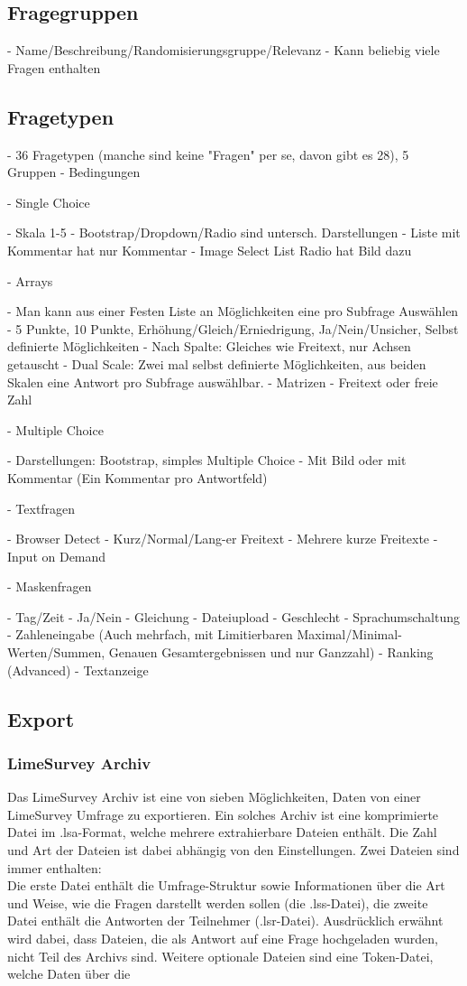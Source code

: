 \subsection{Fragegruppen}

- Name/Beschreibung/Randomisierungsgruppe/Relevanz
- Kann beliebig viele Fragen enthalten

\subsection{Fragetypen}

- 36 Fragetypen (manche sind keine "Fragen" per se, davon gibt es 28), 5 Gruppen
- Bedingungen

- Single Choice

- Skala 1-5
- Bootstrap/Dropdown/Radio sind untersch. Darstellungen
- Liste mit Kommentar hat nur Kommentar
- Image Select List Radio hat Bild dazu

- Arrays

- Man kann aus einer Festen Liste an Möglichkeiten eine pro Subfrage Auswählen
- 5 Punkte, 10 Punkte, Erhöhung/Gleich/Erniedrigung, Ja/Nein/Unsicher, Selbst definierte Möglichkeiten
- Nach Spalte: Gleiches wie Freitext, nur Achsen getauscht
- Dual Scale: Zwei mal selbst definierte Möglichkeiten, aus beiden Skalen eine Antwort pro Subfrage auswählbar.
- Matrizen
- Freitext oder freie Zahl

- Multiple Choice

- Darstellungen: Bootstrap, simples Multiple Choice
- Mit Bild oder mit Kommentar (Ein Kommentar pro Antwortfeld)

- Textfragen

- Browser Detect
- Kurz/Normal/Lang-er Freitext
- Mehrere kurze Freitexte
- Input on Demand

- Maskenfragen

- Tag/Zeit
- Ja/Nein
- Gleichung
- Dateiupload
- Geschlecht
- Sprachumschaltung
- Zahleneingabe (Auch mehrfach, mit Limitierbaren Maximal/Minimal-Werten/Summen, Genauen Gesamtergebnissen und nur Ganzzahl)
- Ranking (Advanced)
- Textanzeige

\subsection{Export}
\subsubsection{LimeSurvey Archiv}
\label{lsa}
Das LimeSurvey Archiv ist eine von sieben Möglichkeiten, Daten von einer LimeSurvey Umfrage zu exportieren.
Ein solches Archiv ist eine komprimierte Datei im .lsa-Format, welche mehrere extrahierbare Dateien enthält.
Die Zahl und Art der Dateien ist dabei abhängig von den Einstellungen. Zwei Dateien sind immer enthalten:\\
Die erste Datei enthält die Umfrage-Struktur sowie Informationen über die Art und Weise, wie die Fragen darstellt werden sollen (die .lss-Datei), die zweite Datei enthält die Antworten der Teilnehmer (.lsr-Datei).
Ausdrücklich erwähnt wird dabei, dass Dateien, die als Antwort auf eine Frage hochgeladen wurden, nicht Teil des Archivs sind.
Weitere optionale Dateien sind eine Token-Datei, welche Daten über die %


